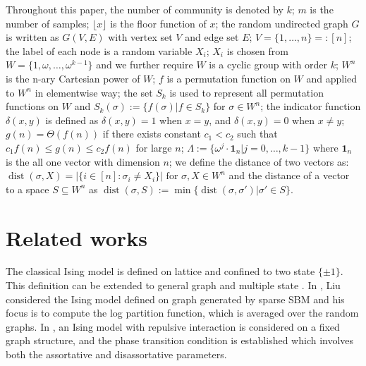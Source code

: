 \documentclass[journal]{IEEEtran}
\newcommand{\1}{\mathbbm{1}}
\DeclareMathOperator{\dist}{dist}
\begin{document}
Throughout this paper, the number of community is denoted by $k$; $m$ is the number of samples; $\lfloor x \rfloor$ is the floor function of $x$; the random undirected graph $G$ is written as $G(V,E)$ with vertex set $V$ and edge set $E$;
$V=\{1,\dots, n\} =: [n]$;
the label of each node is a random variable $X_i$; $X_i$ is chosen from $W= \{1, \omega, \dots, \omega^{k-1}\}$ and we further require $W$
is a cyclic group with order $k$; $W^n$ is the n-ary Cartesian power of $W$;
$f$ is a permutation function on $W$ and applied to $W^n$ in elementwise way;
the set $S_k$ is used to represent all permutation functions on $W$ and $S_k(\sigma):=\{f(\sigma)| f\in S_k\}$ for $\sigma \in W^n$;
the indicator function $\delta(x,y)$ is defined as
$\delta(x,y) = 1 $ when $x=y$, and $\delta(x,y)=0$ when $x\neq y$;
$g(n) = \Theta(f(n))$ if there exists constant $c_1 < c_2$ such that $c_1 f(n) \leq g(n) \leq c_2 f(n)$
for large $n$;
$\Lambda := \{ \omega^j  \cdot \mathbf{1}_n | j=0, \dots,k-1\}$
where $\mathbf{1}_n$ is the all one vector with dimension $n$;
we define the distance of two vectors as:
$\dist(\sigma, X)
=|\{i\in[n]:\sigma_i\neq X_i\}| \textrm{ for } \sigma,X\in W^n
$ and the distance of a vector to a space $S\subseteq W^n$
as
$\dist(\sigma,S)
:=\min\{\dist(\sigma, \sigma') | \sigma' \in S\}
$.
\section{Related works}
The classical Ising model is defined on lattice and confined to two state $\{\pm 1\}$. This definition
can be extended to general graph and multiple state \cite{potts1952some}. In \cite{liu2017log}, Liu considered
the Ising model defined on graph generated by sparse SBM and his focus is to compute the log partition function,
which is averaged over the random graphs. In \cite{berthet2019exact}, an Ising model with repulsive interaction
is considered on a fixed graph structure, and the phase transition condition is established which involves both the assortative and disassortative
parameters.
\end{document}
